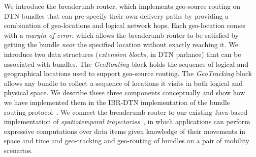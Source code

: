 We introduce the {\sc breadcrumb} router, which implements geo-source routing on DTN bundles that can pre-specify their own delivery paths by providing a combination of geo-locations and logical network hops. 
Each geo-location comes with a {\em margin of error}, which allows the {\sc breadcrumb} router to be satisfied by getting the bundle {\em near} the specified location without exactly reaching it. We introduce two data structures ({\em extension blocks}, in DTN parlance) that can be associated with bundles. The {\em GeoRouting} block holds the sequence of logical and geographical locations used to support geo-source routing. The {\em GeoTracking} block allows any bundle to collect a sequence of locations it visits in both logical and physical space. We describe these three components conceptually and show how we have implemented them in the IBR-DTN implementation of the bundle routing protocol~\cite{IBR-DTN-WASA}. We connect the {\sc breadcrumb} router to our existing Java-based implementation of {\em spatiotemporal trajectories}~\cite{michel12:spatiotemporal}, in which applications can perform expressive computations over data items given knowledge of their movements in space and time and geo-tracking and geo-routing of bundles on a pair of mobility scenarios.





